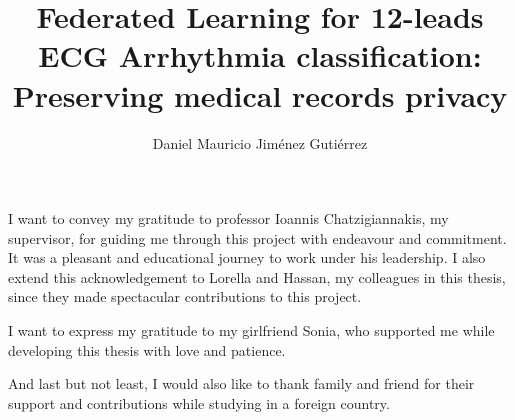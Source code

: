 \documentclass[LaM,binding=0.6cm]{sapthesis}
\title{Federated Learning for 12-leads ECG Arrhythmia classification: Preserving medical records privacy}
\author{Daniel Mauricio Jiménez Gutiérrez}
\begin{document}
\frontmatter

\maketitle
\dedication{Dedicated to God, my family and my love one}





\makeatletter
\renewcommand{\SAP@AbstractLabel}{Abstract}
\makeatother

\begin{acknowledgments}
\parskip=12pt

I want to convey my gratitude to professor Ioannis Chatzigiannakis, my supervisor, for guiding me through this project with endeavour and commitment. It was a pleasant and educational journey to work under his leadership. I also extend this acknowledgement to Lorella and Hassan, my colleagues in this thesis, since they made spectacular contributions to this project.

I want to express my gratitude to my girlfriend Sonia, who supported me while developing this thesis with love and patience.

And last but not least, I would also like to thank family and friend for their support and contributions while studying in a foreign country.



\end{acknowledgments}

\tableofcontents

\mainmatter

\parskip=5pt













\backmatter
\cleardoublepage
{}
\end{document}
